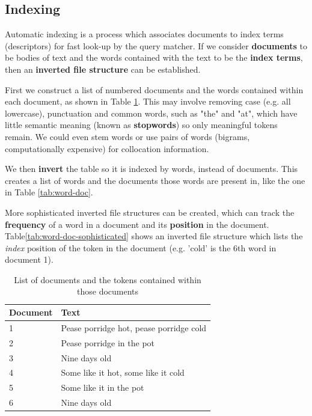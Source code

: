 \documentclass{article}
\begin{document}
\subsection{Indexing}

Automatic indexing is a process which associates documents to index terms (descriptors) for fast look-up by the query matcher. If we consider \textbf{documents} to be bodies of text and the words contained with the text to be the \textbf{index terms}, then an \textbf{inverted file structure} can be established.

First we construct a list of numbered documents and the words contained within each document, as shown in Table \ref{tab:doc-word}. This may involve removing case (e.g. all lowercase), punctuation and common words, such as "the" and "at", which have little semantic meaning (known as \textbf{stopwords}) so only meaningful tokens remain. We could even stem words or use pairs of words (bigrams, computationally expensive) for collocation information.

We then \textbf{invert} the table so it is indexed by words, instead of documents. This creates a list of words and the documents those words are present in, like the one in Table \ref{tab:word-doc}.

More sophisticated inverted file structures can be created, which can track the \textbf{frequency} of a word in a document and its \textbf{position} in the document. Table\ref{tab:word-doc-sophisticated} shows an inverted file structure which lists the \textit{index} position of the token in the document (e.g. 'cold' is the 6th word in document 1).

\begin{table}
	\centering
	\begin{tabular}{|l|l|}
		\hline
		\textbf{Document} & \textbf{Text} \\
		\hline		
		1 & Pease porridge hot, pease porridge cold \\
		2 & Pease porridge in the pot \\
		3 & Nine days old \\
		4 & Some like it hot, some like it cold \\
		5 & Some like it in the pot \\
		6 & Nine days old \\
		\hline				
	\end{tabular}
	\caption{List of documents and the tokens contained within those documents}
	\label{tab:doc-word}
\end{table}
\end{document}
